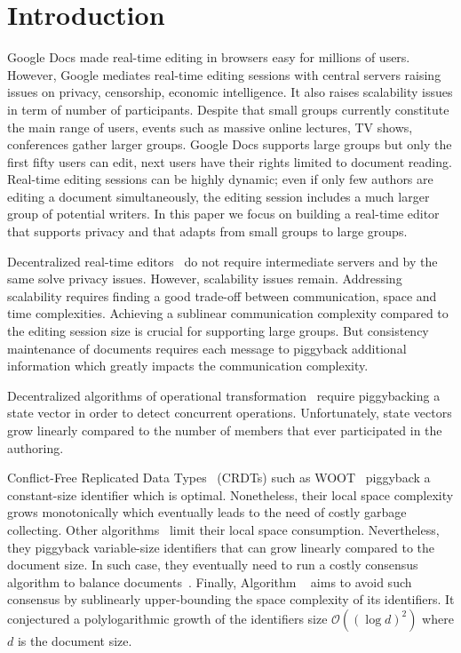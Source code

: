 
\section{Introduction}

Google Docs made real-time editing in browsers easy for millions of
users. However, Google mediates real-time editing sessions with central servers
raising issues on privacy, censorship, economic intelligence. It also raises
scalability issues in term of number of participants.  Despite that small groups
currently constitute the main range of users, events such as massive online
lectures, TV shows, conferences gather larger groups.  Google Docs supports
large groups but only the first fifty users can edit, next users have their
rights limited to document reading. 
Real-time editing sessions can be highly dynamic; even if only few authors are
editing a document simultaneously, the editing session includes a much larger
group of potential writers. In this paper we focus on building a real-time
editor that supports privacy and that adapts  from small groups to
large groups.

Decentralized real-time editors~\cite{oster2006data, sun1998operational,
  sun2009contextbased} do not require intermediate servers and by the same solve
privacy issues. However, scalability issues remain.  Addressing scalability
requires finding a good trade-off between communication, space and time
complexities. Achieving a sublinear communication complexity compared to the
editing session size is crucial for supporting large groups.   But consistency maintenance of
documents requires each message to piggyback additional information which
greatly impacts the communication complexity.

Decentralized algorithms of operational
transformation~\cite{sun2009contextbased} require piggybacking a state
vector in order to detect concurrent operations. Unfortunately, state
vectors grow linearly compared to the number of members that ever
participated in the authoring.

Conflict-Free Replicated Data Types~\cite{shapiro2011comprehensive}
(CRDTs) such as WOOT~\cite{oster2006data} piggyback a constant-size
identifier which is optimal. Nonetheless, their local space complexity
grows monotonically which eventually leads to the need of costly
garbage collecting. Other algorithms~\cite{preguica2009commutative,
  weiss2010logootundo} limit their local space
consumption. Nevertheless, they piggyback variable-size identifiers
that can grow linearly compared to the document size. In such case,
they eventually need to run a costly consensus algorithm to balance
documents~\cite{zawirski2011asynchronous}. Finally, Algorithm
\LSEQ~\cite{nedelec2013concurrency} aims to avoid such consensus by
sublinearly upper-bounding the space complexity of its identifiers. It
conjectured a polylogarithmic growth of the identifiers size
$\mathcal{O}((\log d)^2)$ where $d$ is the document size.

